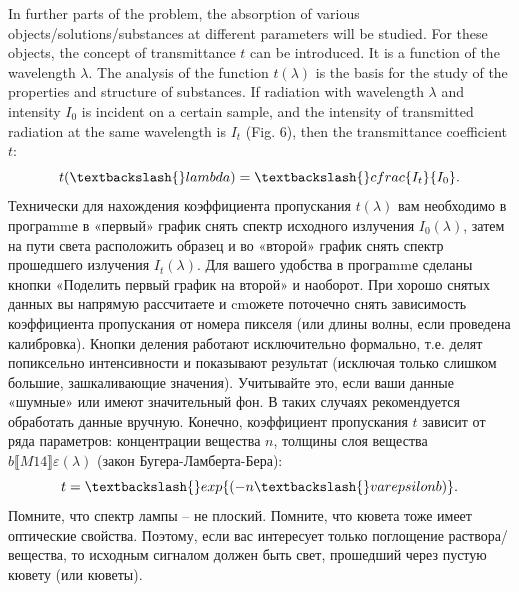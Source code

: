 \documentclass[11pt,a4paper]{article}
\begin{document}
In further parts of the problem, the absorption of various objects/solutions/substances at different parameters will be studied. For these objects, the concept of transmittance $t$ can be introduced. It is a function of the wavelength $\lambda$. The analysis of the function $t(\lambda)$ is the basis for the study of the properties and structure of substances. If radiation with wavelength $\lambda$ and intensity $I_0$ is incident on a certain sample, and the intensity of transmitted radiation at the same wavelength is $I_t$ (Fig. 6), then the transmittance coefficient $t$: $$t(\textbackslash\{\}lambda)=\textbackslash\{\}cfrac\{I_t\}\{I_0\}.$$ Технически для нахождения коэффициента пропускания $t(\lambda)$ вам необходимо в програmmе в «первый» график снять спектр исходного излучения $I_0(\lambda)$, затем на пути света расположить образец и во «второй» график снять спектр прошедшего излучения $I_t(\lambda)$. Для вашего удобства в програmmе сделаны кнопки «Поделить первый график на второй» и наоборот. При хорошо снятых данных вы напрямую рассчитаете и cmожете поточечно снять зависимость коэффициента пропускания от номера пикселя (или длины волны, если проведена калибровка). Кнопки деления работают исключительно формально, т.е. делят попиксельно интенсивности и показывают результат (исключая только слишком большие, зашкаливающие значения). Учитывайте это, если ваши данные «шумные» или имеют значительный фон. В таких случаях рекомендуется обработать данные вручную. Конечно, коэффициент пропускания $t$ зависит от ряда параметров: концентрации вещества $n$, толщины слоя вещества $b⟦ M14⟧\varepsilon(\lambda)$ (закон Бугера-Ламберта-Бера): $$t=\textbackslash\{\}exp\{(-n\textbackslash\{\}varepsilon b)\}.$$ Помните, что спектр лампы – не плоский. Помните, что кювета тоже имеет оптические свойства. Поэтому, если вас интересует только поглощение раствора/вещества, то исходным сигналом должен быть свет, прошедший через пустую кювету (или кюветы).
\end{document}
